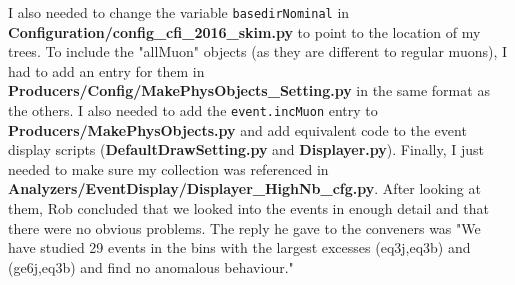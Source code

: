 I also needed to change the variable \texttt{basedirNominal} in \textbf{Configuration/config\_cfi\_2016\_skim.py} to point to the location of my trees. To include the "allMuon" objects (as they are different to regular muons), I had to add an entry for them in \textbf{Producers/Config/MakePhysObjects\_Setting.py} in the same format as the others. I also needed to add the \texttt{event.incMuon} entry to \textbf{Producers/MakePhysObjects.py} and add equivalent code to the event display scripts (\textbf{DefaultDrawSetting.py} and \textbf{Displayer.py}). Finally, I just needed to make sure my collection was referenced in \textbf{Analyzers/EventDisplay/Displayer\_HighNb\_cfg.py}. After looking at them, Rob concluded that we looked into the events in enough detail and that there were no obvious problems. The reply he gave to the conveners was "We have studied 29 events in the bins with the largest excesses (eq3j,eq3b) and (ge6j,eq3b) and find no anomalous behaviour."
